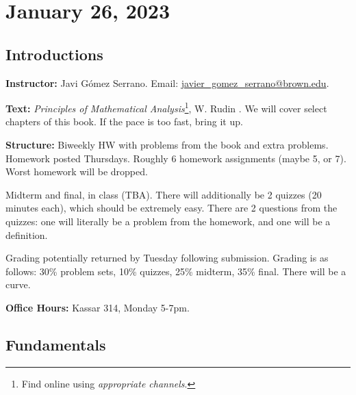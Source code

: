 \section{January 26, 2023}
\subsection{Introductions}
\textbf{Instructor:} Javi G\'omez Serrano. Email: \href{mailto:javier_gomez_serrano@brown.edu}{javier\_gomez\_serrano@brown.edu}.

\textbf{Text:} \emph{Principles of Mathematical Analysis}\footnote{Find online using \emph{appropriate channels}.}, W. Rudin \cite{rudin1976principles}. We will cover select chapters of this book. If the pace is too fast, bring it up.

\textbf{Structure:} Biweekly HW with problems from the book and extra problems. Homework posted Thursdays. Roughly 6 homework assignments (maybe 5, or 7). Worst homework will be dropped.

Midterm and final, in class (TBA). There will additionally be 2 quizzes (20 minutes each), which should be extremely easy. There are 2 questions from the quizzes: one will literally be a problem from the homework, and one will be a definition.

Grading potentially returned by Tuesday following submission. Grading is as follows: 30\% problem sets, 10\% quizzes, 25\% midterm, 35\% final. There will be a curve.

\textbf{Office Hours:} Kassar 314, Monday 5-7pm.

\subsection{Fundamentals}
